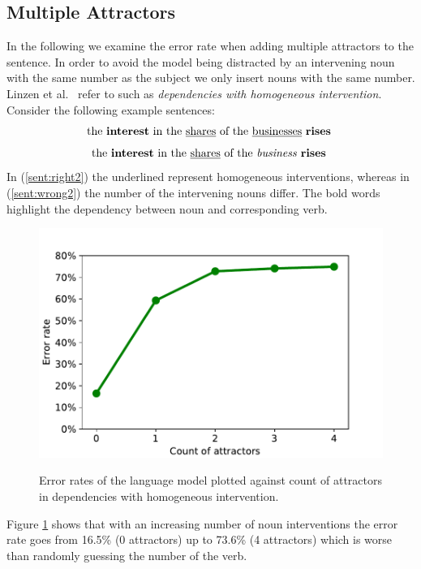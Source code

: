 \documentclass[11pt,a4paper]{article}
\begin{document}
\subsection{Multiple Attractors}
\label{replication-attractors}

In the following we examine the error rate when adding multiple attractors to the sentence. In order to avoid the model being distracted by an intervening noun with the same number as the subject we only insert nouns with the same number. Linzen et al.~\citep{Linzen2016} refer to such as  \textit{ dependencies with homogeneous intervention}. Consider the following example sentences:
\begin{equation}
	\label{sent:right2}
	\textnormal{the \textbf{interest} in the \underline{shares} of the \underline{businesses} \textbf{rises} }
\end{equation}
\begin{equation}
	\label{sent:wrong2}
	\textnormal{the \textbf{interest} in the \underline{shares} of the \textit{business} \textbf{rises} }
\end{equation}
In (\ref{sent:right2}) the underlined represent homogeneous interventions, whereas in (\ref{sent:wrong2}) the number of the intervening nouns differ. The bold words highlight the dependency between noun and corresponding verb.
    \begin{figure}
    \centering
        \includegraphics[scale=0.5]{2c.pdf}
        \label{fig:2c}
        \vspace*{-5mm}
            \caption{Error rates of the language model plotted against count of attractors in dependencies with homogeneous intervention.}
    \end{figure}
Figure \ref{fig:2c} shows that with an increasing number of noun interventions the error rate goes from 16.5\% (0 attractors) up to 73.6\% (4 attractors) which is worse than randomly guessing the number of the verb.
\end{document}
